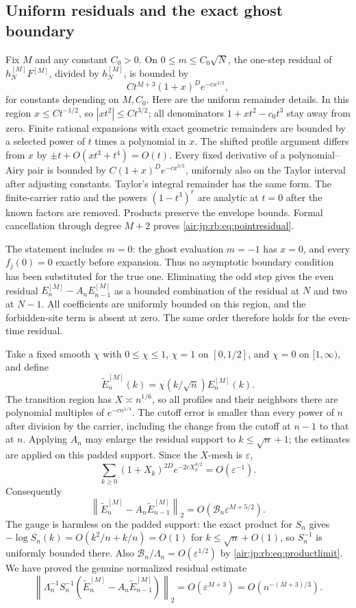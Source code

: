 \documentclass[11pt,letterpaper]{article}
\numberwithin{equation}{section}
\theoremstyle{remark}
\newcommand{\norm}[1]{\left\lVert#1\right\rVert}
\newcommand{\eps}{\varepsilon}
\begin{document}
\subsection{Uniform residuals and the exact ghost boundary}
Fix $M$ and any constant $C_0>0$. On $0\le m\le C_0\sqrt N$, the one-step residual of $h_N^{[M]}F^{[M]}$, divided by $h_N^{[M]}$, is bounded by
\begin{equation}\label{air:jp:rb:eq:pointresidual}
 Ct^{M+3}(1+x)^D e^{-cx^{3/2}},
\end{equation}
for constants depending on $M,C_0$. Here are the uniform remainder details. In this region $x\le Ct^{-1/2}$, so $|xt^2|\le Ct^{3/2}$; all denominators $1+xt^2-c_0t^3$ stay away from zero. Finite rational expansions with exact geometric remainders are bounded by a selected power of $t$ times a polynomial in $x$. The shifted profile argument differs from $x$ by
$\pm t+O(xt^3+t^4)=O(t)$. Every fixed derivative of a polynomial--Airy pair is bounded by $C(1+x)^De^{-cx^{3/2}}$, uniformly also on the Taylor interval after adjusting constants. Taylor's integral remainder has the same form. The finite-carrier ratio and the powers $(1-t^3)^r$ are analytic at $t=0$ after the known factors are removed. Products preserve the envelope bounds. Formal cancellation through degree $M+2$ proves \eqref{air:jp:rb:eq:pointresidual}.

The statement includes $m=0$: the ghost evaluation $m=-1$ has $x=0$, and every $f_j(0)=0$ exactly before expansion. Thus no asymptotic boundary condition has been substituted for the true one. Eliminating the odd step gives the even residual $E_n^{[M]}-A_nE_{n-1}^{[M]}$ as a bounded combination of the residual at $N$ and two at $N-1$. All coefficients are uniformly bounded on this region, and the forbidden-site term is absent at zero. The same order therefore holds for the even-time residual.

Take a fixed smooth $\chi$ with $0\le\chi\le1$, $\chi=1$ on $[0,1/2]$, and $\chi=0$ on $[1,\infty)$, and define
\[
 \widetilde E_n^{[M]}(k)=\chi(k/\sqrt n)E_n^{[M]}(k).
\]
The transition region has $X\asymp n^{1/6}$, so all profiles and their neighbors there are polynomial multiples of $e^{-cn^{1/4}}$. The cutoff error is smaller than every power of $n$ after division by the carrier, including the change from the cutoff at $n-1$ to that at $n$. Applying $A_n$ may enlarge the residual support to $k\le\sqrt n+1$; the estimates are applied on this padded support.
Since the $X$-mesh is $\eps$,
\[
 \sum_{k\ge0}(1+X_k)^{2D}e^{-2cX_k^{3/2}}=O(\eps^{-1}).
\]
Consequently
\[
 \norm{\widetilde E_n^{[M]}-A_n\widetilde E_{n-1}^{[M]}}_2
 =O(\mathcal B_n\eps^{M+5/2}).
\]
The gauge is harmless on the padded support: the exact product for $S_n$ gives
$-\log S_n(k)=O(k^2/n+k/n)=O(1)$ for $k\le\sqrt n+O(1)$, so $S_n^{-1}$ is uniformly bounded there. Also $\mathcal B_n/\Lambda_n=O(\eps^{1/2})$ by \eqref{air:jp:rb:eq:productlimit}. We have proved the genuine normalized residual estimate
\begin{equation}\label{air:jp:rb:eq:normresidual}
 \norm{\Lambda_n^{-1}S_n^{-1}
 (\widetilde E_n^{[M]}-A_n\widetilde E_{n-1}^{[M]})}_2
 =O(\eps^{M+3})=O(n^{-(M+3)/3}).
\end{equation}
\end{document}
